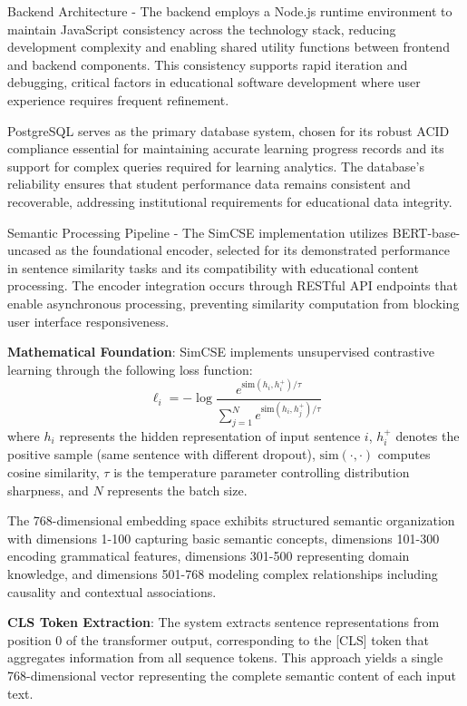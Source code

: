 {Backend Architecture - The backend employs a Node.js runtime environment to maintain JavaScript consistency across the technology stack, reducing development complexity and enabling shared utility functions between frontend and backend components. This consistency supports rapid iteration and debugging, critical factors in educational software development where user experience requires frequent refinement.

PostgreSQL serves as the primary database system, chosen for its robust ACID compliance essential for maintaining accurate learning progress records and its support for complex queries required for learning analytics. The database's reliability ensures that student performance data remains consistent and recoverable, addressing institutional requirements for educational data integrity.

Semantic Processing Pipeline - The SimCSE implementation utilizes BERT-base-uncased as the foundational encoder, selected for its demonstrated performance in sentence similarity tasks and its compatibility with educational content processing. The encoder integration occurs through RESTful API endpoints that enable asynchronous processing, preventing similarity computation from blocking user interface responsiveness.

\textbf{Mathematical Foundation}: SimCSE implements unsupervised contrastive learning through the following loss function:
\begin{equation}
\ell_i = -\log \frac{e^{\text{sim}(h_i, h_i^+)/\tau}}{\sum_{j=1}^{N} e^{\text{sim}(h_i, h_j^+)/\tau}}
\end{equation}
where $h_i$ represents the hidden representation of input sentence $i$, $h_i^+$ denotes the positive sample (same sentence with different dropout), $\text{sim}(\cdot,\cdot)$ computes cosine similarity, $\tau$ is the temperature parameter controlling distribution sharpness, and $N$ represents the batch size.

The 768-dimensional embedding space exhibits structured semantic organization with dimensions 1-100 capturing basic semantic concepts, dimensions 101-300 encoding grammatical features, dimensions 301-500 representing domain knowledge, and dimensions 501-768 modeling complex relationships including causality and contextual associations.

\textbf{CLS Token Extraction}: The system extracts sentence representations from position 0 of the transformer output, corresponding to the [CLS] token that aggregates information from all sequence tokens. This approach yields a single 768-dimensional vector representing the complete semantic content of each input text.

}

